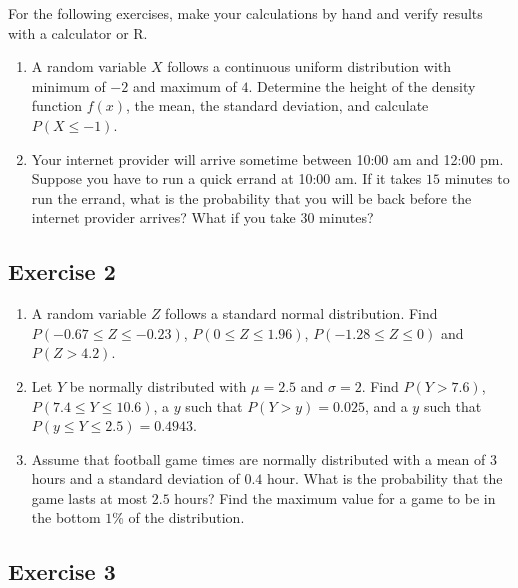 \documentclass[
  letterpaper,
  DIV=11,
  numbers=noendperiod]{scrreprt}
\begin{document}
For the following exercises, make your calculations by hand and verify
results with a calculator or R.

\begin{enumerate}
\def\labelenumi{\arabic{enumi}.}
\item
  A random variable \(X\) follows a continuous uniform distribution with
  minimum of \(-2\) and maximum of \(4\). Determine the height of the
  density function \(f(x)\), the mean, the standard deviation, and
  calculate \(P(X \leq -1)\).
\item
  Your internet provider will arrive sometime between 10:00 am and 12:00
  pm. Suppose you have to run a quick errand at 10:00 am. If it takes
  \(15\) minutes to run the errand, what is the probability that you
  will be back before the internet provider arrives? What if you take
  \(30\) minutes?
\end{enumerate}

\hypertarget{exercise-2-18}{%
\subsection*{Exercise 2}\label{exercise-2-18}}

\begin{enumerate}
\def\labelenumi{\arabic{enumi}.}
\item
  A random variable \(Z\) follows a standard normal distribution. Find
  \(P(-0.67 \leq Z \leq -0.23)\), \(P(0 \leq Z \leq 1.96)\),
  \(P(-1.28 \leq Z \leq 0)\) and \(P(Z > 4.2)\).
\item
  Let \(Y\) be normally distributed with \(\mu=2.5\) and \(\sigma=2\).
  Find \(P(Y>7.6)\), \(P(7.4 \leq Y \leq 10.6)\), a \(y\) such that
  \(P(Y>y)=0.025\), and a \(y\) such that
  \(P(y \leq Y \leq 2.5)=0.4943\).
\item
  Assume that football game times are normally distributed with a mean
  of \(3\) hours and a standard deviation of \(0.4\) hour. What is the
  probability that the game lasts at most \(2.5\) hours? Find the
  maximum value for a game to be in the bottom \(1\)\% of the
  distribution.
\end{enumerate}

\hypertarget{exercise-3-18}{%
\subsection*{Exercise 3}\label{exercise-3-18}}
\end{document}
